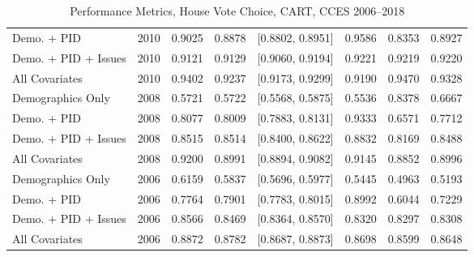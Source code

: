 \begin{table}[H]
\begin{tabular}{lrrrlrrr}
  Demo. + PID & 2010 & 0.9025 & 0.8878 & [0.8802, 0.8951] & 0.9586 & 0.8353 & 0.8927 \\ 
  Demo. + PID + Issues & 2010 & 0.9121 & 0.9129 & [0.9060, 0.9194] & 0.9221 & 0.9219 & 0.9220 \\ 
  All Covariates & 2010 & 0.9402 & 0.9237 & [0.9173, 0.9299] & 0.9190 & 0.9470 & 0.9328 \\ 
  Demographics Only & 2008 & 0.5721 & 0.5722 & [0.5568, 0.5875] & 0.5536 & 0.8378 & 0.6667 \\ 
  Demo. + PID & 2008 & 0.8077 & 0.8009 & [0.7883, 0.8131] & 0.9333 & 0.6571 & 0.7712 \\ 
  Demo. + PID + Issues & 2008 & 0.8515 & 0.8514 & [0.8400, 0.8622] & 0.8832 & 0.8169 & 0.8488 \\ 
  All Covariates & 2008 & 0.9200 & 0.8991 & [0.8894, 0.9082] & 0.9145 & 0.8852 & 0.8996 \\ 
  Demographics Only & 2006 & 0.6159 & 0.5837 & [0.5696, 0.5977] & 0.5445 & 0.4963 & 0.5193 \\ 
  Demo. + PID & 2006 & 0.7764 & 0.7901 & [0.7783, 0.8015] & 0.8992 & 0.6044 & 0.7229 \\ 
  Demo. + PID + Issues & 2006 & 0.8566 & 0.8469 & [0.8364, 0.8570] & 0.8320 & 0.8297 & 0.8308 \\ 
  All Covariates & 2006 & 0.8872 & 0.8782 & [0.8687, 0.8873] & 0.8698 & 0.8599 & 0.8648 \\ 
   \bottomrule
\end{tabular}
\caption{Performance Metrics, House Vote Choice, CART, CCES 2006--2018} 
\label{tab:cces_house_cart}
\end{table}
